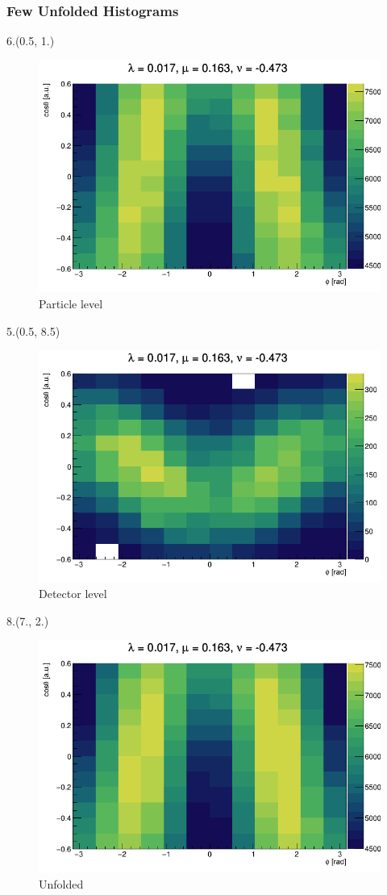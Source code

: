 \documentclass[12pt, xcolor={dvipsnames}, aspectratio = 169, sans, mathserif]{beamer}
\newenvironment{Pic}[2]
{\begin{textblock}{#1}#2
\begin{figure}}
{\end{figure}
\end{textblock}}
\begin{document}
\begin{frame}
\frametitle{Few Unfolded Histograms}

\begin{Pic}{6.}{(0.5, 1.)}
  \caption{Particle level}
  \includegraphics[width=6.cm]{imgs/true_fit_3.png}
\end{Pic}

\begin{Pic}{5.}{(0.5, 8.5)}
  \caption{Detector level}
  \includegraphics[width=5.cm]{imgs/reco_fit_3.png}
\end{Pic}

\begin{Pic}{8.}{(7., 2.)}
  \caption{Unfolded}
  \includegraphics[width=8.cm]{imgs/pred_fit_3.png}
\end{Pic}
\end{frame}
\end{document}
